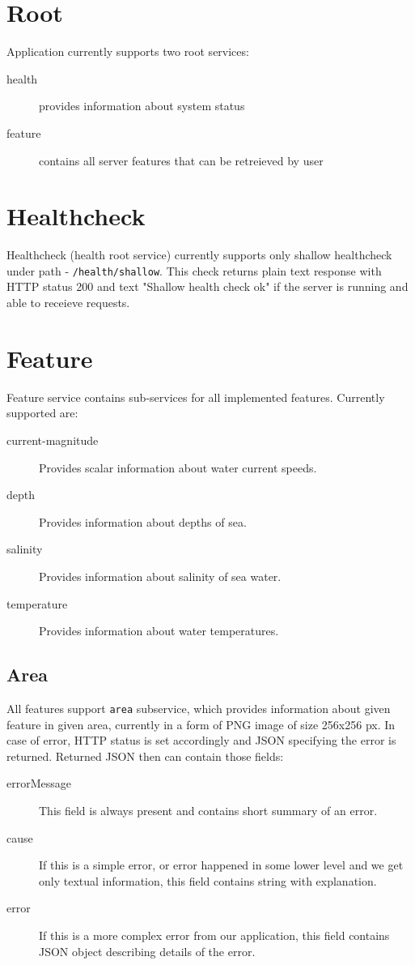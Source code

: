 \documentclass[11pt,a4paper,titlepage,oneside]{report}
\begin{document}
\section{Root}

Application currently supports two root services:
\begin{description}
	\item[health] provides information about system status
	\item[feature] contains all server features that can be retreieved by user
\end{description}

\section{Healthcheck}

Healthcheck (health root service) currently supports only shallow healthcheck under path - \texttt{/health/shallow}. This check returns plain text response with \gls{HTTP} status 200 and text "Shallow health check ok" if the server is running and able to receieve requests. \\

\section{Feature}

Feature service contains sub-services for all implemented features. Currently supported are:
\begin{description}
	\item[current-magnitude] Provides scalar information about water current speeds.
	\item[depth] Provides information about depths of sea.
	\item[salinity] Provides information about salinity of sea water.
	\item[temperature] Provides information about water temperatures.
\end{description}

\subsection{Area}

All features support \texttt{area} subservice, which provides information about given feature in given area, currently in a form of \gls{PNG} image of size 256x256 px. In case of error, \gls{HTTP} status is set accordingly and \gls{JSON} specifying the error is returned. Returned \gls{JSON} then can contain those fields:
\begin{description}
	\item[errorMessage] This field is always present and contains short summary of an error.
	\item[cause] If this is a simple error, or error happened in some lower level and we get only textual information, this field contains string with explanation.
	\item[error] If this is a more complex error from our application, this field contains \gls{JSON} object describing details of the error.
\end{description}
\end{document}
